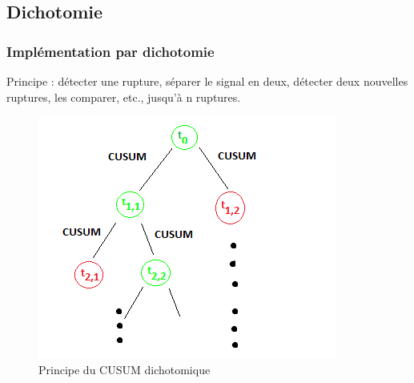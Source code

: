\documentclass{beamer}
\begin{document}
\subsection{Dichotomie}

\begin{frame}

\frametitle{Implémentation par dichotomie}

Principe : détecter une rupture, séparer le signal en deux, détecter deux nouvelles ruptures, les comparer, etc., jusqu'à n ruptures.
\begin{figure}
	\includegraphics[scale=0.5]{diagramme_cusum_dikt.png}
	\caption{Principe du CUSUM dichotomique}
\end{figure}



\end{frame}
\end{document}
